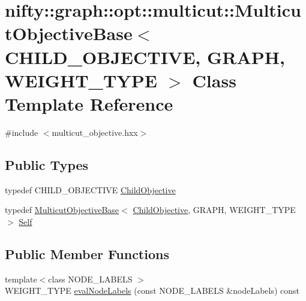 \hypertarget{classnifty_1_1graph_1_1opt_1_1multicut_1_1MulticutObjectiveBase}{}\section{nifty\+:\+:graph\+:\+:opt\+:\+:multicut\+:\+:Multicut\+Objective\+Base$<$ C\+H\+I\+L\+D\+\_\+\+O\+B\+J\+E\+C\+T\+I\+VE, G\+R\+A\+PH, W\+E\+I\+G\+H\+T\+\_\+\+T\+Y\+PE $>$ Class Template Reference}
\label{classnifty_1_1graph_1_1opt_1_1multicut_1_1MulticutObjectiveBase}


{\ttfamily \#include $<$multicut\+\_\+objective.\+hxx$>$}

\subsection*{Public Types}
\begin{DoxyCompactItemize}
\item 
typedef C\+H\+I\+L\+D\+\_\+\+O\+B\+J\+E\+C\+T\+I\+VE \hyperlink{classnifty_1_1graph_1_1opt_1_1multicut_1_1MulticutObjectiveBase_a5acf025b98f33ce503ddd157c3f56a53}{Child\+Objective}
\item 
typedef \hyperlink{classnifty_1_1graph_1_1opt_1_1multicut_1_1MulticutObjectiveBase}{Multicut\+Objective\+Base}$<$ \hyperlink{classnifty_1_1graph_1_1opt_1_1multicut_1_1MulticutObjectiveBase_a5acf025b98f33ce503ddd157c3f56a53}{Child\+Objective}, G\+R\+A\+PH, W\+E\+I\+G\+H\+T\+\_\+\+T\+Y\+PE $>$ \hyperlink{classnifty_1_1graph_1_1opt_1_1multicut_1_1MulticutObjectiveBase_a4071799f8254ec6fbc7d0cb5cb141464}{Self}
\end{DoxyCompactItemize}
\subsection*{Public Member Functions}
\begin{DoxyCompactItemize}
\item 
{\footnotesize template$<$class N\+O\+D\+E\+\_\+\+L\+A\+B\+E\+LS $>$ }\\W\+E\+I\+G\+H\+T\+\_\+\+T\+Y\+PE \hyperlink{classnifty_1_1graph_1_1opt_1_1multicut_1_1MulticutObjectiveBase_a46baad38ba237fc1bca02ec5719dd869}{eval\+Node\+Labels} (const N\+O\+D\+E\+\_\+\+L\+A\+B\+E\+LS \&node\+Labels) const
\end{DoxyCompactItemize}


